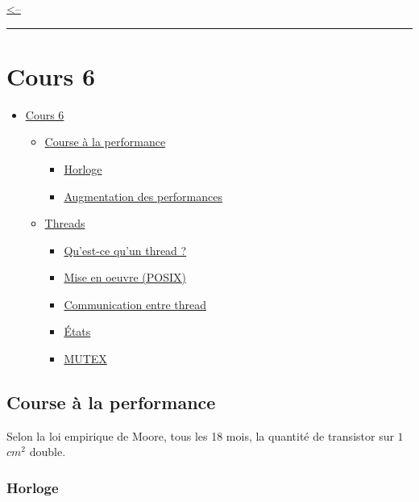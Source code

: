 \href{../README.md}{\textless--}

\begin{center}\rule{0.5\linewidth}{0.5pt}\end{center}

\section{Cours 6}\label{cours-6}

\begin{itemize}
\tightlist
\item
  \hyperref[cours-6]{Cours 6}

  \begin{itemize}
  \tightlist
  \item
    \hyperref[course-uxe0-la-performance]{Course à la performance}

    \begin{itemize}
    \tightlist
    \item
      \hyperref[horloge]{Horloge}
    \item
      \hyperref[augmentation-des-performances]{Augmentation des
      performances}
    \end{itemize}
  \item
    \hyperref[threads]{Threads}

    \begin{itemize}
    \tightlist
    \item
      \hyperref[quest-ce-quun-thread-]{Qu'est-ce qu'un thread ?}
    \item
      \hyperref[mise-en-oeuvre-posix]{Mise en oeuvre (POSIX)}
    \item
      \hyperref[communication-entre-thread]{Communication entre thread}
    \item
      \hyperref[uxe9tats]{États}
    \item
      \hyperref[mutex]{MUTEX}
    \end{itemize}
  \end{itemize}
\end{itemize}

\subsection{Course à la performance}\label{course-uxe0-la-performance}

Selon la loi empirique de Moore, tous les 18 mois, la quantité de
transistor sur \(1\) \(cm^2\) double.

\subsubsection{Horloge}\label{horloge}

